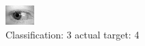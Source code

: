 \begin{figure}[h!]
\begin{center}
\includegraphics[width=0.60\columnwidth]{figures/ID749_class_3_target_4.png}
\end{center}
\caption{ Classification: 3 actual target: 4}
\label{fig:ID749_class_3_target_4}
\end{figure}
